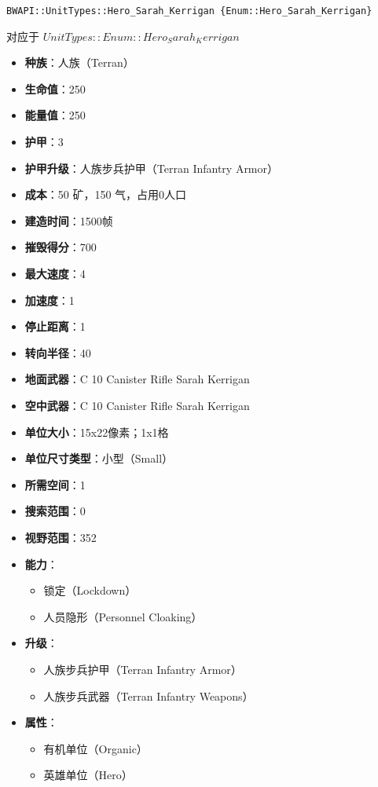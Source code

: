 \begin{tcolorbox}[colback=white, colframe=black!60!white, title=Hero\_Sarah\_Kerrigan(), arc=0mm]
    \begin{verbatim}
BWAPI::UnitTypes::Hero_Sarah_Kerrigan {Enum::Hero_Sarah_Kerrigan}
    \end{verbatim}
    对应于  $ UnitTypes::Enum::Hero_Sarah_Kerrigan $ 
    \begin{itemize}
        \item \textbf{种族}：人族（Terran）
        \item \textbf{生命值}：250
        \item \textbf{能量值}：250
        \item \textbf{护甲}：3
        \item \textbf{护甲升级}：人族步兵护甲（Terran Infantry Armor）
        \item \textbf{成本}：50 矿，150 气，占用0人口
        \item \textbf{建造时间}：1500帧
        \item \textbf{摧毁得分}：700
        \item \textbf{最大速度}：4
        \item \textbf{加速度}：1
        \item \textbf{停止距离}：1
        \item \textbf{转向半径}：40
        \item \textbf{地面武器}：C 10 Canister Rifle Sarah Kerrigan
        \item \textbf{空中武器}：C 10 Canister Rifle Sarah Kerrigan
        \item \textbf{单位大小}：15x22像素；1x1格
        \item \textbf{单位尺寸类型}：小型（Small）
        \item \textbf{所需空间}：1
        \item \textbf{搜索范围}：0
        \item \textbf{视野范围}：352
        \item \textbf{能力}：
            \begin{itemize}
                \item 锁定（Lockdown）
                \item 人员隐形（Personnel Cloaking）
            \end{itemize}
        \item \textbf{升级}：
            \begin{itemize}
                \item 人族步兵护甲（Terran Infantry Armor）
                \item 人族步兵武器（Terran Infantry Weapons）
            \end{itemize}
        \item \textbf{属性}：
            \begin{itemize}
                \item 有机单位（Organic）
                \item 英雄单位（Hero）
            \end{itemize}
    \end{itemize}
    
\end{tcolorbox}

